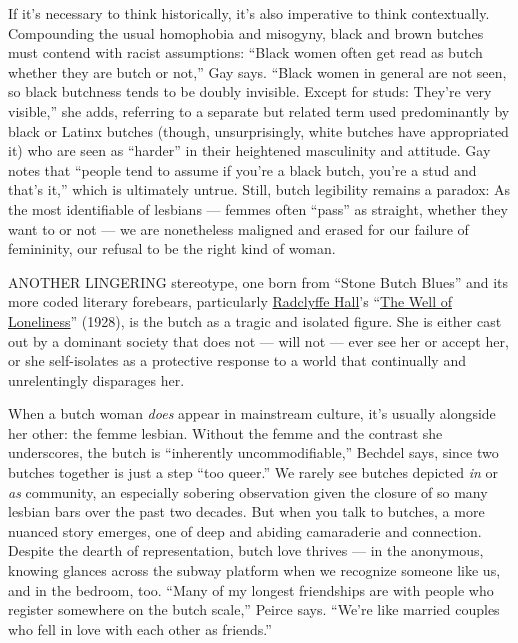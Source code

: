 If it's necessary to think historically, it's also imperative to think
contextually. Compounding the usual homophobia and misogyny, black and
brown butches must contend with racist assumptions: ``Black women often
get read as butch whether they are butch or not,'' Gay says. ``Black
women in general are not seen, so black butchness tends to be doubly
invisible. Except for studs: They're very visible,'' she adds, referring
to a separate but related term used predominantly by black or Latinx
butches (though, unsurprisingly, white butches have appropriated it) who
are seen as ``harder'' in their heightened masculinity and attitude. Gay
notes that ``people tend to assume if you're a black butch, you're a
stud and that's it,'' which is ultimately untrue. Still, butch
legibility remains a paradox: As the most identifiable of lesbians ---
femmes often ``pass'' as straight, whether they want to or not --- we
are nonetheless maligned and erased for our failure of femininity, our
refusal to be the right kind of woman.

ANOTHER LINGERING stereotype, one born from ``Stone Butch Blues'' and
its more coded literary forebears, particularly
\href{https://www.britannica.com/biography/Radclyffe-Hall}{Radclyffe
Hall}'s
``\href{https://www.penguinrandomhouse.com/books/73965/the-well-of-loneliness-by-radclyffe-hall/}{The
Well of Loneliness}'' (1928), is the butch as a tragic and isolated
figure. She is either cast out by a dominant society that does not ---
will not --- ever see her or accept her, or she self-isolates as a
protective response to a world that continually and unrelentingly
disparages her.

When a butch woman \emph{does} appear in mainstream culture, it's
usually alongside her other: the femme lesbian. Without the femme and
the contrast she underscores, the butch is ``inherently
uncommodifiable,'' Bechdel says, since two butches together is just a
step ``too queer.'' We rarely see butches depicted \emph{in} or
\emph{as} community, an especially sobering observation given the
closure of so many lesbian bars over the past two decades. But when you
talk to butches, a more nuanced story emerges, one of deep and abiding
camaraderie and connection. Despite the dearth of representation, butch
love thrives --- in the anonymous, knowing glances across the subway
platform when we recognize someone like us, and in the bedroom, too.
``Many of my longest friendships are with people who register somewhere
on the butch scale,'' Peirce says. ``We're like married couples who fell
in love with each other as friends.''


